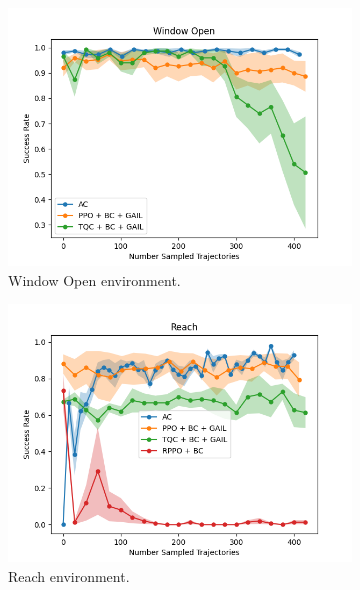 \begin{figure}[htbp]
    \centering
    \begin{subfigure}[b]{0.45\textwidth}
      \includegraphics[width=\textwidth]{images/15_400/Window Open.png}
      \caption{Window Open environment.}
      \label{fig:plot1}
    \end{subfigure}
    \hfill
    \begin{subfigure}[b]{0.45\textwidth}
      \includegraphics[width=\textwidth]{images/15_400/Reach.png}
      \caption{Reach environment.}
      \label{fig:plot2}
    \end{subfigure}
    \medskip
    \begin{subfigure}[b]{0.45\textwidth}

\end{subfigure}
\end{figure}
